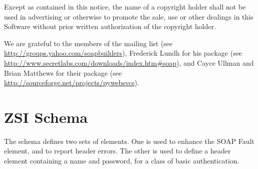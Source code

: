 \documentclass{manual}
\begin{document}
Except as contained in this notice, the name of a copyright holder
shall not be used in advertising or otherwise to promote the sale, use
or other dealings in this Software without prior written authorization
of the copyright holder.

\vfill

\centerline{}

We are grateful to the members of the 
mailing list (see \url{http://groups.yahoo.com/soapbuilders}),
Frederick Lundh for his  package (see
\url{http://www.secretlabs.com/downloads/index.htm\#soap}),
and Cayce Ullman and Brian Matthews for their  package
(see \url{http://sourceforge.net/projects/pywebsvcs}).

\tableofcontents{}
\def\ZSI{\module{ZSI}}












\chapter{ZSI Schema}

The \ZSI{} schema defines two sets of elements.  One is used to enhance
the SOAP Fault  element, and to report header errors.
The other is used to define a header element containing a name and
password, for a class of basic authentication.

\ifx\htmlonly\undefined\else\usepackage{verbatim}\fi

\end{document}
